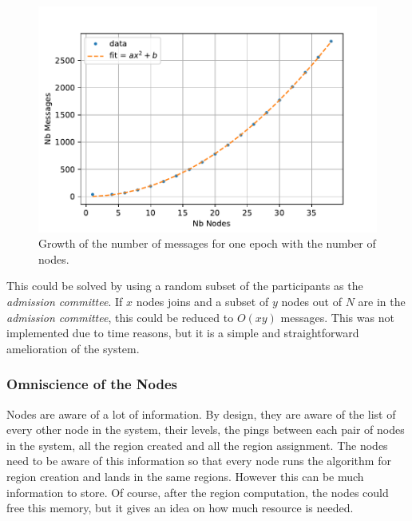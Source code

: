 \documentclass[a4paper,11pt,twoside,openright]{report}
\begin{document}
\begin{figure}[!h] 
\centering
\includegraphics[width=350pt]{figures/messages-plot}
\caption{Growth of the number of messages for one epoch with the number of nodes.}
\label{fig:messages-plot}
\end{figure}



This could be solved by using a random subset of the participants as the \textit{admission committee}. If $x$ nodes joins and a subset of $y$ nodes out of $N$ are in the  \textit{admission committee}, this could be reduced to $O(xy)$ messages. This was not implemented due to time reasons, but it is a simple and straightforward amelioration of the system. 
 
\subsubsection{Omniscience of the Nodes}
Nodes are aware of a lot of information. By design, they are aware of
the list of every other node in the system, their levels, the pings between
each pair of nodes in the system, all the region created and all the region
assignment. The nodes need to be aware of this information so that
every node runs the algorithm for region creation and lands in the same
regions. However this can be much information to store. Of course, after the region computation, the nodes could free this memory, but it gives an idea on how much resource is needed.
\end{document}
